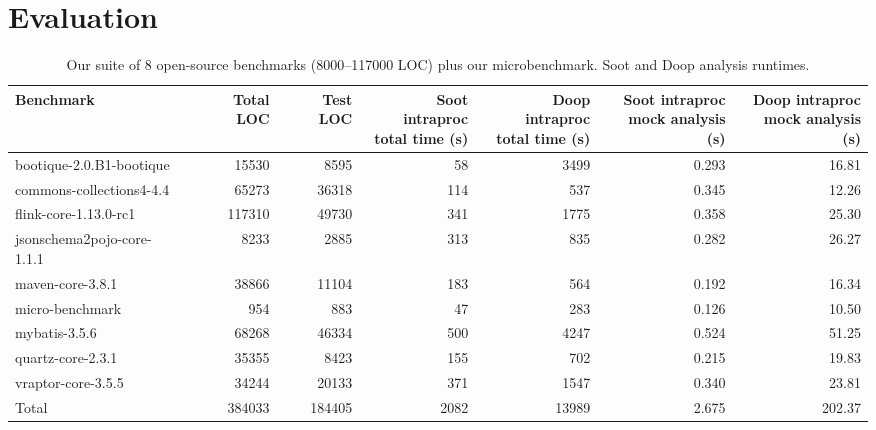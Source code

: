 \chapter{Evaluation}

\begin{table*}
	\centering
	\caption{Our suite of 8 open-source benchmarks (8000--117000 LOC) plus our microbenchmark. Soot and Doop analysis runtimes.}
	\begin{tabular}{lrrrrrr}
		\toprule
		Benchmark & Total LOC & Test LOC & \thead{Soot intraproc \\ total time (s)} & \thead{Doop intraproc \\ total time (s)} & \thead{Soot intraproc \\ mock analysis (s)}  & \thead{Doop intraproc \\ mock analysis (s)} \\
		\midrule
		bootique-2.0.B1-bootique           		&  15530   & 8595   & 58  & 3499  &  0.293   & 16.81       \\
		commons-collections4-4.4           		&  65273   & 36318  & 114 & 537   &  0.345   & 12.26       \\
		flink-core-1.13.0-rc1           		&  117310  & 49730  & 341 & 1775  &  0.358   & 25.30        \\
		jsonschema2pojo-core-1.1.1         		&  8233    & 2885   & 313 & 835   &  0.282   & 26.27       \\
		maven-core-3.8.1   		           		&  38866   & 11104  & 183 & 564   &  0.192   & 16.34        \\
		micro-benchmark         		  		&  954     & 883	& 47  & 283   &  0.126   & 10.50        \\
		mybatis-3.5.6         		  			&  68268   & 46334  & 500 & 4247  &  0.524   & 51.25        \\
		quartz-core-2.3.1        	  			&  35355   & 8423   & 155 & 702   &  0.215   & 19.83     \\
		vraptor-core-3.5.5         	  			&  34244   & 20133  & 371 & 1547  &  0.340   & 23.81      \\
		\bottomrule
		Total         	  						&  384033  & 184405 & 2082 & 13989 &  2.675  & 202.37     \\
	\end{tabular}
	\label{tab:runtimes}
\end{table*}


